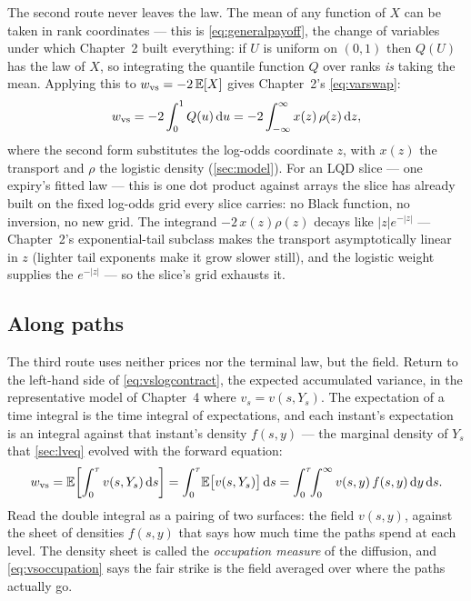 The second route never leaves the law.  The mean of any function of
$X$ can be taken in rank coordinates --- this is
\cref{eq:generalpayoff}, the change of variables under which Chapter~2
built everything: if $U$ is uniform on $(0,1)$ then $Q(U)$ has the law
of $X$, so integrating the quantile function $Q$ over ranks
\emph{is} taking the mean.  Applying this to
$w_{\rm vs}=-2\,\mathbb{E}[X]$ gives Chapter~2's \cref{eq:varswap}:
\begin{equation*}
w_{\rm vs}
=-2\int_0^{1}Q(u)\,\mathrm{d} u
=-2\int_{-\infty}^{\infty}x(z)\,\rho(z)\,\mathrm{d} z ,
\end{equation*}
where the second form substitutes the log-odds coordinate $z$, with
$x(z)$ the transport and $\rho$ the logistic density
(\cref{sec:model}).  For an LQD slice --- one expiry's fitted law ---
this is one dot product against arrays the slice has already built on
the fixed log-odds grid every slice carries: no Black function, no
inversion, no new grid.  The integrand $-2\,x(z)\rho(z)$ decays like
$|z|e^{-|z|}$ --- Chapter~2's exponential-tail subclass makes the
transport asymptotically linear in $z$ (lighter tail exponents make
it grow slower still), and the logistic weight supplies the
$e^{-|z|}$ --- so the slice's grid exhausts it.

\subsection{Along paths}

The third route uses neither prices nor the terminal law, but the
field.  Return to the left-hand side of \eqref{eq:vslogcontract},
the expected accumulated variance, in the representative model of
Chapter~4 where $v_s=v(s,Y_s)$.  The expectation of a time integral is
the time integral of expectations, and each instant's expectation is
an integral against that instant's density $f(s,y)$ --- the marginal
density of $Y_s$ that \cref{sec:lveq} evolved with the forward
equation:
\begin{equation}
w_{\rm vs}
=\mathbb{E}\!\left[\int_0^{\tau}v(s,Y_s)\,\mathrm{d} s\right]
=\int_0^{\tau}\!\mathbb{E}\big[v(s,Y_s)\big]\,\mathrm{d} s
=\int_0^{\tau}\!\!\int_0^{\infty}v(s,y)\,f(s,y)\,\mathrm{d} y\,\mathrm{d} s .
\label{eq:vsoccupation}
\end{equation}
Read the double integral as a pairing of two surfaces: the field
$v(s,y)$, against the sheet of densities $f(s,y)$ that says how much
time the paths spend at each level.  The density sheet is called the
\emph{occupation measure} of the diffusion, and \eqref{eq:vsoccupation}
says the fair strike is the field averaged over where the paths
actually go.

